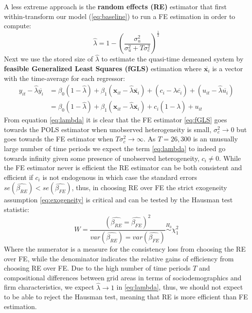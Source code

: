 \bigskip\par
A less extreme approach is the \textbf{random effects (RE)} estimator that first within-transform our model (\ref{eq:baseline}) to run a FE estimation in order to compute:
\begin{equation}
  \widehat{\lambda}=1-\left(\frac{\sigma^2_u}{\sigma^2_u+T\sigma^2_c}\right)^\frac{1}{2}
  \label{eq:lambda}
\end{equation}
Next we use the stored size of $\widehat{\lambda}$ to estimate the quasi-time demeaned system by \textbf{feasible Generalized Least Squares (fGLS)} estimation where $\overline{\bm{x}_i}$ is a vector with the time-average for each regressor:
\begin{equation}
    \begin{split}
        y_{it}-\widehat{\lambda}\overline{y_i}&=\beta_0\left(1-\widehat{\lambda}\right)+\beta_1\left(\bm{x}_{it}-\widehat{\lambda}\overline{\bm{x}_i}\right)+\left(c_i-\widehat{\lambda}\overline{c_i}\right)+\left(u_{it}-\widehat{\lambda}\overline{u_i}\right) \\
        &=\beta_0\left(1-\widehat{\lambda}\right)+\beta_1\left(\bm{x}_{it}-\widehat{\lambda}\overline{\bm{x}_i}\right)+c_i\left(1-\widehat{\lambda}\right)+u_{it}
    \end{split}
    \label{eq:fGLS}
\end{equation}
From equation \eqref{eq:lambda} it is clear that the FE estimator \eqref{eq:fGLS} goes towards the POLS estimator when unobserved heterogeneity is small, $\sigma_c^2\rightarrow0$ but goes towards the FE estimator when $T\sigma_c^2\rightarrow\infty$. As $T=26,300$ is an unusually large number of time periods we expect the term \eqref{eq:lambda} to indeed go towards infinity given some presence of unobserved heterogeneity, $c_i\neq0$. While the FE estimator never is efficient the RE estimator can be both consistent and efficient if $c_i$ is not endogenous in which case the standard errors $se\left(\widehat{\beta_{RE}}\right)<se\left(\widehat{\beta_{FE}}\right)$, thus, in choosing RE over FE the strict exogeneity assumption \eqref{eq:exogeneity} is critical and can be tested by the Hausman test statistic:
\begin{equation}
  W=\frac{\left(\widehat{\beta_{RE}}=\widehat{\beta_{FE}}\right)^2}
         {var(\widehat{\beta_{RE}})=var(\widehat{\beta_{FE}})}
         \stackrel{H_0}{\sim} \chi^2_1
  \label{eq:hausman}
\end{equation}
Where the numerator is a measure for the consistency loss from choosing the RE over FE, while the denominator indicates the relative gains of efficiency from choosing RE over FE. Due to the high number of time periods $T$ and compositional differences between grid areas in terms of sociodemographics and firm characteristics, we expect $\widehat{\lambda}\rightarrow1$ in \eqref{eq:lambda}, thus, we should not expect to be able to reject the Hausman test, meaning that RE is more efficient than FE estimation.
